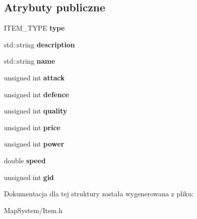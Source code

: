 \subsection*{Atrybuty publiczne}
\begin{DoxyCompactItemize}
\item 
\hypertarget{struct_item_data_a5c5156ae0135589ea4b55c6dd98db949}{I\-T\-E\-M\-\_\-\-T\-Y\-P\-E {\bfseries type}}\label{struct_item_data_a5c5156ae0135589ea4b55c6dd98db949}

\item 
\hypertarget{struct_item_data_a8122ea77a63a91c64c28a0f7c4ecc539}{std\-::string {\bfseries description}}\label{struct_item_data_a8122ea77a63a91c64c28a0f7c4ecc539}

\item 
\hypertarget{struct_item_data_afb2976e864aa2c9192ef37655210779e}{std\-::string {\bfseries name}}\label{struct_item_data_afb2976e864aa2c9192ef37655210779e}

\item 
\hypertarget{struct_item_data_aac974de802eb3281a00d20b4f4b00919}{unsigned int {\bfseries attack}}\label{struct_item_data_aac974de802eb3281a00d20b4f4b00919}

\item 
\hypertarget{struct_item_data_a06d5face6e73693026ebc173c2e3cb00}{unsigned int {\bfseries defence}}\label{struct_item_data_a06d5face6e73693026ebc173c2e3cb00}

\item 
\hypertarget{struct_item_data_a794a313d4a37e04c2d56033a0a77e84b}{unsigned int {\bfseries quality}}\label{struct_item_data_a794a313d4a37e04c2d56033a0a77e84b}

\item 
\hypertarget{struct_item_data_a29ee94503d48e86a837070b8bf3a408f}{unsigned int {\bfseries price}}\label{struct_item_data_a29ee94503d48e86a837070b8bf3a408f}

\item 
\hypertarget{struct_item_data_add0c206f5054df876030bc6cbd655911}{unsigned int {\bfseries power}}\label{struct_item_data_add0c206f5054df876030bc6cbd655911}

\item 
\hypertarget{struct_item_data_a58d2216af72e9e608ce69dd620037d86}{double {\bfseries speed}}\label{struct_item_data_a58d2216af72e9e608ce69dd620037d86}

\item 
\hypertarget{struct_item_data_a0d109a02f6200ca17476e721b07b32a9}{unsigned int {\bfseries gid}}\label{struct_item_data_a0d109a02f6200ca17476e721b07b32a9}

\end{DoxyCompactItemize}


Dokumentacja dla tej struktury została wygenerowana z pliku\-:\begin{DoxyCompactItemize}
\item 
Map\-System/Item.\-h\end{DoxyCompactItemize}
